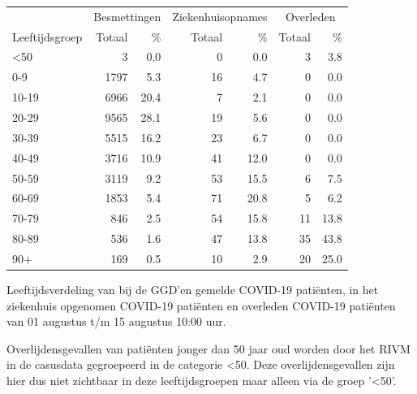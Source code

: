\documentclass[
  english,
  man,floatsintext]{apa6}
\begin{document}
\begin{table}
\centering\begingroup\fontsize{11}{13}\selectfont

\begin{threeparttable}
\begin{tabular}{lrrrrrr}
\toprule
\multicolumn{1}{c}{ } & \multicolumn{2}{c}{Besmettingen} & \multicolumn{2}{c}{Ziekenhuisopnames} & \multicolumn{2}{c}{Overleden} \\
\cmidrule(l{3pt}r{3pt}){2-3} \cmidrule(l{3pt}r{3pt}){4-5} \cmidrule(l{3pt}r{3pt}){6-7}
Leeftijdsgroep & Totaal & \% & Totaal & \% & Totaal & \%\\
\midrule
<50 & 3 & 0.0 & 0 & 0.0 & 3 & 3.8\\
0-9 & 1797 & 5.3 & 16 & 4.7 & 0 & 0.0\\
10-19 & 6966 & 20.4 & 7 & 2.1 & 0 & 0.0\\
20-29 & 9565 & 28.1 & 19 & 5.6 & 0 & 0.0\\
30-39 & 5515 & 16.2 & 23 & 6.7 & 0 & 0.0\\
40-49 & 3716 & 10.9 & 41 & 12.0 & 0 & 0.0\\
50-59 & 3119 & 9.2 & 53 & 15.5 & 6 & 7.5\\
60-69 & 1853 & 5.4 & 71 & 20.8 & 5 & 6.2\\
70-79 & 846 & 2.5 & 54 & 15.8 & 11 & 13.8\\
80-89 & 536 & 1.6 & 47 & 13.8 & 35 & 43.8\\
90+ & 169 & 0.5 & 10 & 2.9 & 20 & 25.0\\
\bottomrule
\end{tabular}
\begin{tablenotes}
\item[1] Leeftijdsverdeling van bij de GGD’en gemelde COVID-19 patiënten, in het ziekenhuis opgenomen COVID-19 patiënten en overleden COVID-19 patiënten van 01 augustus t/m 15 augustus 10:00 uur.
\item[2] Overlijdensgevallen van patiënten jonger dan 50 jaar oud worden door het RIVM in de casusdata gegroepeerd in de categorie <50. Deze overlijdensgevallen zijn hier dus niet zichtbaar in deze leeftijdsgroepen maar alleen via de groep '<50'.
\end{tablenotes}
\end{threeparttable}
\endgroup{}
\end{table}

\newpage
\end{document}
